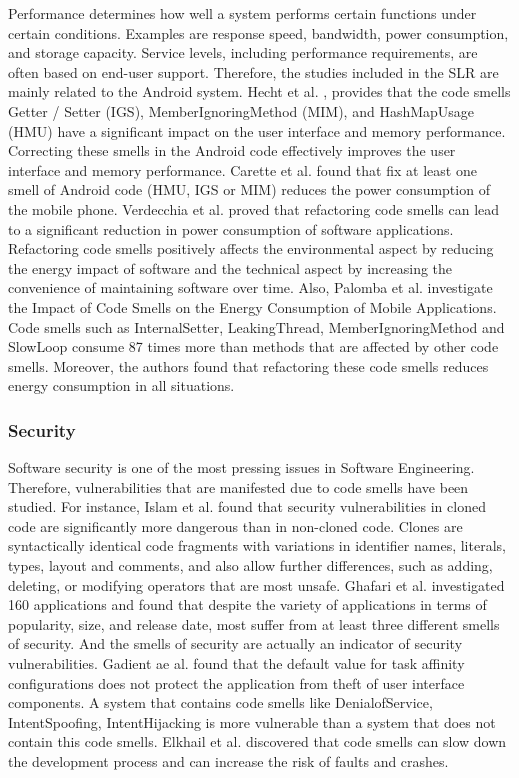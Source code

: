 \documentclass{sigchi}
\begin{document}
Performance determines how well a system performs certain functions under certain conditions. Examples are response speed, bandwidth, power consumption, and storage capacity. Service levels, including performance requirements, are often based on end-user support. Therefore, the studies included in the SLR are mainly related to the Android system. Hecht et al. \cite{Hecht}, provides that the code smells Getter / Setter (IGS), MemberIgnoringMethod (MIM), and HashMapUsage (HMU) have a significant impact on the user interface and memory performance. Correcting these smells in the Android code effectively improves the user interface and memory performance. Carette et al. \cite{Carette} found that fix at least one smell of Android code (HMU, IGS or MIM) reduces the power consumption of the mobile phone. Verdecchia et al. \cite{Verdecchia} proved that refactoring code smells can lead to a significant reduction in power consumption of software applications. Refactoring code smells positively affects the environmental aspect by reducing the energy impact of software and the technical aspect by increasing the convenience of maintaining software over time. Also, Palomba et al. \cite{Palomba3} investigate the Impact of Code Smells on the Energy Consumption of Mobile Applications. Code smells such as InternalSetter, LeakingThread, MemberIgnoringMethod and SlowLoop consume 87 times more than methods that are affected by other code smells. Moreover, the authors found that refactoring these code smells reduces energy consumption in all situations. 

\subsubsection{Security}

Software security is one of the most pressing issues in Software Engineering. Therefore, vulnerabilities that are manifested due to code smells have been studied. For instance, Islam et al. \cite{Islam} found that security vulnerabilities in cloned code are significantly more dangerous than in non-cloned code. Clones are syntactically identical code fragments with variations in identifier names, literals, types, layout and comments, and also allow further differences, such as adding, deleting, or modifying operators that are most unsafe. 
Ghafari et al. \cite{Ghafari} investigated 160 applications and found that despite the variety of applications in terms of popularity, size, and release date, most suffer from at least three different smells of security. And the smells of security are actually an indicator of security vulnerabilities.
Gadient ae al. \cite{Gadient} found that the default value for task affinity configurations does not protect the application from theft of user interface components. A system that contains code smells like DenialofService, IntentSpoofing, IntentHijacking is more vulnerable than a system that does not contain this code smells.
Elkhail et al. \cite{Elkhail} discovered that code smells can slow down the development process and can increase the risk of faults and crashes. 
\end{document}
